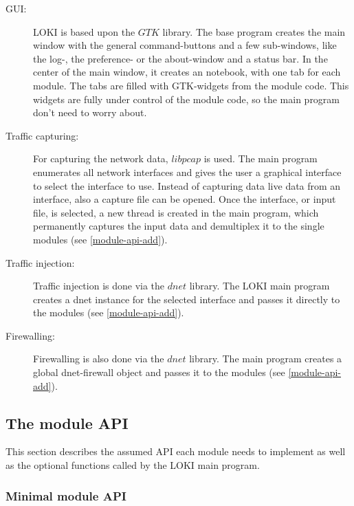 \documentclass[a4paper, 11pt]{article}
\begin{document}
        \begin{description}
            \item[GUI:] LOKI is based upon the $GTK$ library. The base program creates the main window with the general command-buttons and a few sub-windows, like the log-, the preference- or the about-window and a status bar. In the center of the main window, it creates an notebook, with one tab for each module. The tabs are filled with GTK-widgets from the module code. This widgets are fully under control of the module code, so the main program don't need to worry about.
            \item[Traffic capturing:] For capturing the network data, $libpcap$ is used. The main program enumerates all network interfaces and gives the user a graphical interface to select the interface to use. Instead of capturing data live data from an interface, also a capture file can be opened. Once the interface, or input file, is selected, a new thread is created in the main program, which permanently captures the input data and demultiplex it to the single modules (see \ref{module-api-add}).
            \item[Traffic injection:] Traffic injection is done via the $dnet$ library. The LOKI main program creates a dnet instance for the selected interface and passes it directly to the modules (see \ref{module-api-add}).
            \item[Firewalling:] Firewalling is also done via the $dnet$ library. The main program creates a global dnet-firewall object and passes it to the modules (see \ref{module-api-add}).
        \end{description}

        \subsection{The module API}
        This section describes the assumed API each module needs to implement as well as the optional functions called by the LOKI main program.

            \subsubsection{Minimal module API}
\end{document}
